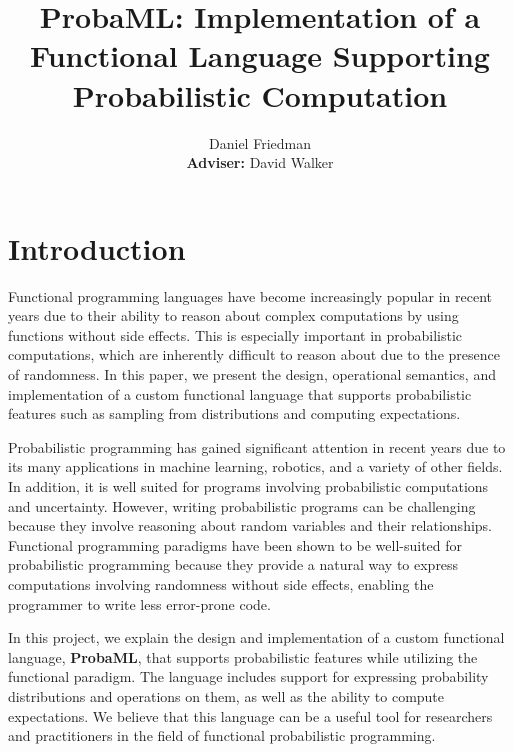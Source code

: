 \documentclass[pageno]{jpaper}
\begin{document}
\thispagestyle{empty}

\title{
  ProbaML: Implementation of a Functional Language Supporting Probabilistic Computation}

\author{Daniel Friedman\\\textbf{Adviser:} David Walker}

\date{}
\maketitle

\thispagestyle{empty}
\doublespacing
\begin{abstract}
\end{abstract}

\tableofcontents

\section{Introduction}
Functional programming languages have become increasingly popular in recent years due to their ability to reason about complex computations by using functions without side effects. This is especially important in probabilistic computations, which are inherently difficult to reason about due to the presence of randomness. In this paper, we present the design, operational semantics, and implementation of a custom functional language that supports probabilistic features such as sampling from distributions and computing expectations.

Probabilistic programming has gained significant attention in recent years due to its many applications in machine learning, robotics, and a variety of other fields. In addition, it is well suited for programs involving probabilistic computations and uncertainty. However, writing probabilistic programs can be challenging because they involve reasoning about random variables and their relationships. Functional programming paradigms have been shown to be well-suited for probabilistic programming because they provide a natural way to express computations involving randomness without side effects, enabling the programmer to write less error-prone code.

In this project, we explain the design and implementation of a custom functional language, \textbf{ProbaML}, that supports probabilistic features while utilizing the functional paradigm. The language includes support for expressing probability distributions and operations on them, as well as the ability to compute expectations. We believe that this language can be a useful tool for researchers and practitioners in the field of functional probabilistic programming.
\end{document}
